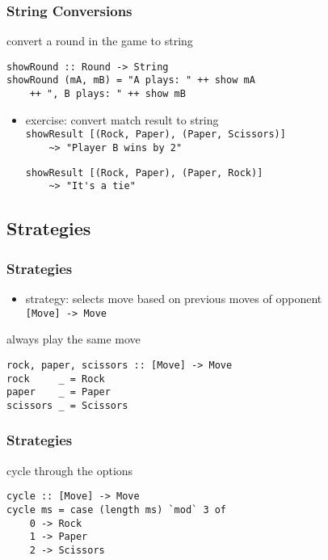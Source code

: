 \documentclass[dvipsnames]{beamer}
\theoremstyle{plain}
\begin{document}
\begin{frame}[fragile]
  \frametitle{String Conversions}

  \begin{exampleblock}{convert a round in the game to string}
    \begin{lstlisting}
showRound :: Round -> String
showRound (mA, mB) = "A plays: " ++ show mA
    ++ ", B plays: " ++ show mB
    \end{lstlisting}
  \end{exampleblock}

  \pause
  \vspace{-12pt}
  \begin{itemize}
    \item exercise: convert match result to string\\
      \lstinline|showResult [(Rock, Paper), (Paper, Scissors)]|\\
      \lstinline|    ~> "Player B wins by 2"|

      \smallskip
      \lstinline|showResult [(Rock, Paper), (Paper, Rock)]|\\
      \lstinline|    ~> "It's a tie"|
  \end{itemize}
\end{frame}

\subsection{Strategies}

\begin{frame}[fragile]
  \frametitle{Strategies}

  \begin{itemize}
    \item strategy: selects move based on previous moves of opponent\\
      \lstinline|[Move] -> Move|
  \end{itemize}

  \begin{exampleblock}{always play the same move}
    \begin{lstlisting}
rock, paper, scissors :: [Move] -> Move
rock     _ = Rock
paper    _ = Paper
scissors _ = Scissors
    \end{lstlisting}
  \end{exampleblock}
\end{frame}

\begin{frame}[fragile]
  \frametitle{Strategies}

  \begin{exampleblock}{cycle through the options}
    \begin{lstlisting}[deletekeywords={cycle}]
cycle :: [Move] -> Move
cycle ms = case (length ms) `mod` 3 of
    0 -> Rock
    1 -> Paper
    2 -> Scissors
    \end{lstlisting}
  \end{exampleblock}
\end{frame}
\end{document}
